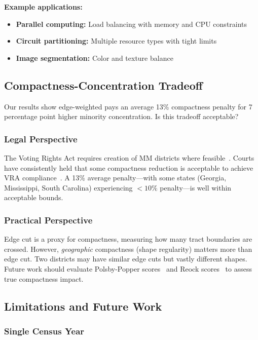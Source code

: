 \textbf{Example applications:}
\begin{itemize}
    \item \textbf{Parallel computing:} Load balancing with memory and CPU constraints
    \item \textbf{Circuit partitioning:} Multiple resource types with tight limits
    \item \textbf{Image segmentation:} Color and texture balance
\end{itemize}

\subsection{Compactness-Concentration Tradeoff}

Our results show edge-weighted pays an average 13\% compactness penalty for 7 percentage point higher minority concentration. Is this tradeoff acceptable?

\subsubsection{Legal Perspective}

The Voting Rights Act requires creation of MM districts where feasible~\cite{thornburg1986}. Courts have consistently held that some compactness reduction is acceptable to achieve VRA compliance~\cite{bush1995}. A 13\% average penalty---with some states (Georgia, Mississippi, South Carolina) experiencing $<10\%$ penalty---is well within acceptable bounds.

\subsubsection{Practical Perspective}

Edge cut is a proxy for compactness, measuring how many tract boundaries are crossed. However, \textit{geographic} compactness (shape regularity) matters more than edge cut. Two districts may have similar edge cuts but vastly different shapes. Future work should evaluate Polsby-Popper scores~\cite{polsby1991third} and Reock scores~\cite{reock1961measure} to assess true compactness impact.

\subsection{Limitations and Future Work}

\subsubsection{Single Census Year}

